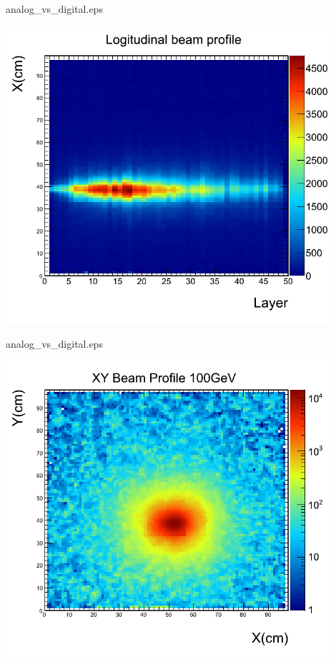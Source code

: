 \documentclass[10pt]{beamer}
\begin{document}
\begin{frame}{analog\_vs\_digital.eps}
    \centerline{\includegraphics[width=0.9\textwidth]{images/Beam2012Longitudinal}}
\end{frame}
\begin{frame}{analog\_vs\_digital.eps}
    \centerline{\includegraphics[width=0.9\textwidth]{images/Beam2012Transverse}}
\end{frame}
\end{document}

